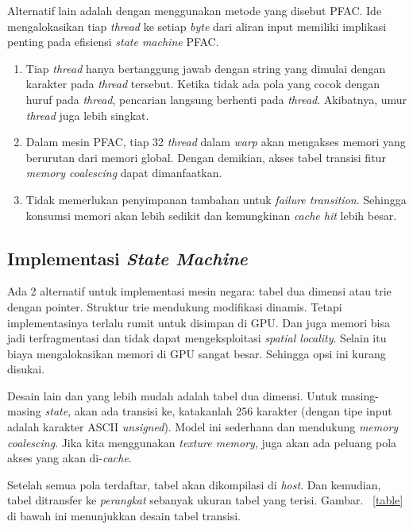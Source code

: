 \documentclass[conference]{IEEEtran}
\begin{document}
        Alternatif lain adalah dengan menggunakan metode yang disebut PFAC. Ide mengalokasikan tiap \emph{thread} ke setiap \emph{byte} dari aliran input memiliki implikasi penting pada efisiensi \emph{state machine} PFAC.

        \begin{enumerate}
            \item 
            Tiap \emph{thread} hanya bertanggung jawab dengan string yang dimulai dengan karakter pada \emph{thread} tersebut. Ketika tidak ada pola yang cocok dengan huruf pada \emph{thread}, pencarian langsung berhenti pada \emph{thread}. Akibatnya, umur \emph{thread} juga lebih singkat.
            
            \item
            Dalam mesin PFAC, tiap 32 \emph{thread} dalam \emph{warp} akan mengakses memori yang berurutan dari memori global. Dengan demikian, akses tabel transisi fitur \emph{memory coalescing} dapat dimanfaatkan.

            \item
            Tidak memerlukan penyimpanan tambahan untuk \emph{failure transition}. Sehingga konsumsi memori akan lebih sedikit dan kemungkinan \emph{cache hit} lebih besar.
        \end{enumerate}

    \subsection{Implementasi \emph{State Machine}}
        Ada 2 alternatif untuk implementasi mesin negara: tabel dua dimensi atau trie dengan pointer. Struktur trie mendukung modifikasi dinamis. Tetapi implementasinya terlalu rumit untuk disimpan di GPU. Dan juga memori bisa jadi terfragmentasi dan tidak dapat mengeksploitasi \emph{spatial locality}. Selain itu biaya mengalokasikan memori di GPU sangat besar. Sehingga opsi ini kurang disukai.
        
        Desain lain dan yang lebih mudah adalah tabel dua dimensi. Untuk masing-masing \emph{state}, akan ada transisi ke, katakanlah 256 karakter (dengan tipe input adalah karakter ASCII \emph{unsigned}). Model ini sederhana dan mendukung \emph{memory coalescing}. Jika kita menggunakan \emph{texture memory}, juga akan ada peluang pola akses yang akan di-\emph{cache}.
        
        Setelah semua pola terdaftar, tabel akan dikompilasi di \emph{host}. Dan kemudian, tabel ditransfer ke \emph{perangkat} sebanyak ukuran tabel yang terisi. Gambar. ~\ref{table} di bawah ini menunjukkan desain tabel transisi.
\end{document}
